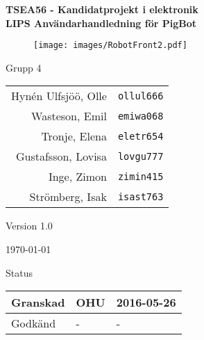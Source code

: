 \documentclass[11pt]{article}
\begin{document}
\begin{titlepage}
\begin{center}

{\Large\bfseries TSEA56 - Kandidatprojekt i elektronik \\ LIPS Användarhandledning för PigBot}

\begin{figure}[!htbp]
  \begin{center}
    \texttt{[image: images/RobotFront2.pdf]}
  \end{center}
\end{figure}


  \begin{minipage}{0.5\textwidth}
    \centering
 Grupp 4 \\
\begin{tabular}{rl}
Hynén Ulfsjöö, Olle&\verb+ollul666+
\\
Wasteson, Emil&\verb+emiwa068+
\\
Tronje, Elena&\verb+eletr654+
\\
Gustafsson, Lovisa&\verb+lovgu777+
\\
Inge, Zimon&\verb+zimin415+
\\
Strömberg, Isak&\verb+isast763+
\\
\end{tabular}
\end{minipage}%
\begin{minipage}{0.5\textwidth}
  \centering
Version 1.0

\today
\vspace{2em}

Status
\begin{longtable}{|l|l|l|} \hline

Granskad & OHU & 2016-05-26 \\ \hline
Godkänd & - & - \\ \hline
 
\end{longtable}
\end{minipage}


\end{center}
\end{titlepage}
\end{document}
